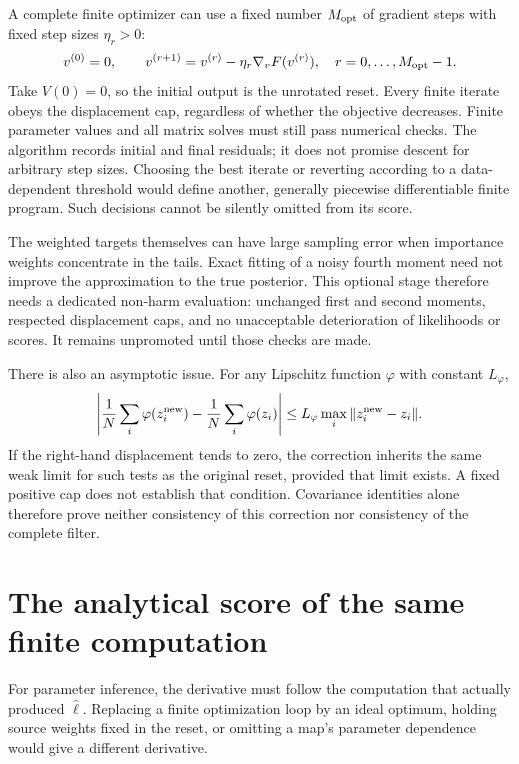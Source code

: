 \documentclass[11pt,a4paper]{article}
\begin{document}
A complete finite optimizer can use a fixed number \(M_{\rm opt}\) of
gradient steps with fixed step sizes \(\eta_r>0\):
\begin{equation}
\label{eq:fixed-optimizer}
 v^{(0)}=0,\qquad
 v^{(r+1)}=v^{(r)}-\eta_r\nabla_v F(v^{(r)}),
 \quad r=0,\ldots,M_{\rm opt}-1.
\end{equation}
Take \(V(0)=0\), so the initial output is the unrotated reset.
Every finite iterate obeys the displacement cap, regardless of whether
the objective decreases. Finite parameter values and all matrix solves
must still pass numerical checks. The algorithm records initial and
final residuals; it does not promise descent for arbitrary step sizes.
Choosing the best iterate or reverting according to a data-dependent
threshold would define another, generally piecewise differentiable
finite program. Such decisions cannot be silently omitted from its score.

The weighted targets themselves can have large sampling error when
importance weights concentrate in the tails. Exact fitting of a noisy
fourth moment need not improve the approximation to the true posterior.
This optional stage therefore needs a dedicated non-harm evaluation:
unchanged first and second moments, respected displacement caps, and
no unacceptable deterioration of likelihoods or scores. It remains
unpromoted until those checks are made.

There is also an asymptotic issue. For any Lipschitz function \(\varphi\)
with constant \(L_\varphi\),
\begin{equation}
\label{eq:weak-displacement}
 \left|\frac1N\sum_i\varphi(z_i^{\rm new})
       -\frac1N\sum_i\varphi(z_i)\right|
 \leq L_\varphi\max_i\|z_i^{\rm new}-z_i\|.
\end{equation}
If the right-hand displacement tends to zero, the correction inherits
the same weak limit for such tests as the original reset, provided that
limit exists. A fixed positive cap does not establish that condition.
Covariance identities alone therefore prove neither consistency of this
correction nor consistency of the complete filter.


\section{The analytical score of the same finite computation}
\label{sec:analytical-score}

For parameter inference, the derivative must follow the computation that
actually produced \(\widehat\ell\). Replacing a finite optimization loop by
an ideal optimum, holding source weights fixed in the reset, or omitting
a map's parameter dependence would give a different derivative.
\end{document}
